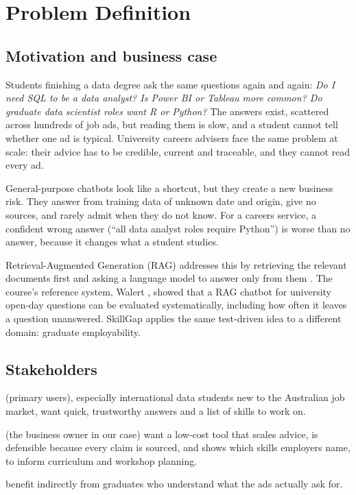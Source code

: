 \section{Problem Definition}\label{sec:problem}

\subsection{Motivation and business case}

Students finishing a data degree ask the same questions again and again: \emph{Do I need SQL to be a data analyst? Is Power BI or Tableau more common? Do graduate data scientist roles want R or Python?} The answers exist, scattered across hundreds of job ads, but reading them is slow, and a student cannot tell whether one ad is typical. University careers advisers face the same problem at scale: their advice has to be credible, current and traceable, and they cannot read every ad.

General-purpose chatbots look like a shortcut, but they create a new business risk. They answer from training data of unknown date and origin, give no sources, and rarely admit when they do not know. For a careers service, a confident wrong answer (``all data analyst roles require Python'') is worse than no answer, because it changes what a student studies.

Retrieval-Augmented Generation (RAG) addresses this by retrieving the relevant documents first and asking a language model to answer only from them \citep{lewis2020rag}. The course's reference system, Walert \citep{pathiyan2024walert}, showed that a RAG chatbot for university open-day questions can be evaluated systematically, including how often it leaves a question unanswered. SkillGap applies the same test-driven idea to a different domain: graduate employability.

\subsection{Stakeholders}

\begin{description}[leftmargin=0pt]
  \item[Graduates and students] (primary users), especially international data students new to the Australian job market, want quick, trustworthy answers and a list of skills to work on.
  \item[University careers services and course coordinators] (the business owner in our case) want a low-cost tool that scales advice, is defensible because every claim is sourced, and shows which skills employers name, to inform curriculum and workshop planning.
  \item[Employers] benefit indirectly from graduates who understand what the ads actually ask for.
\end{description}

